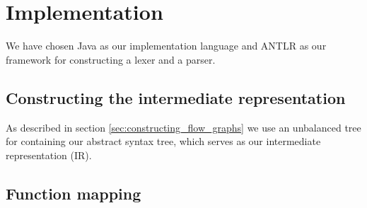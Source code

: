 \section{Implementation}
We have chosen Java as our implementation language and ANTLR as our framework for constructing a lexer and a parser.

\subsection{Constructing the intermediate representation}
As described in section \ref{sec:constructing_flow_graphs} we use an unbalanced tree for containing our abstract syntax tree, which serves as our intermediate representation (IR).

\subsection{Function mapping}
